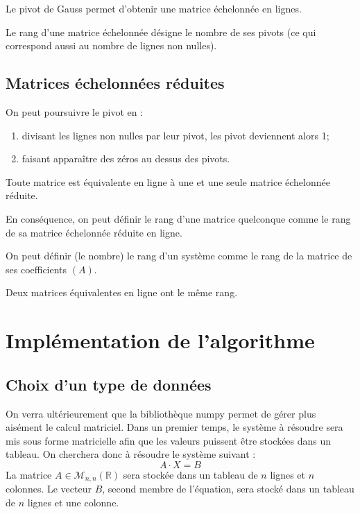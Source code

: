 \documentclass[10pt]{article}
\begin{document}
\begin{prop}
Le pivot de Gauss permet d'obtenir une matrice échelonnée en lignes. 
\end{prop}

\begin{defi}
Le rang d'une matrice échelonnée désigne le nombre de ses pivots (ce qui correspond aussi au nombre de lignes non nulles). 
\end{defi}

\subsection{Matrices échelonnées réduites}
On peut poursuivre le pivot en : 
\begin{enumerate}
\item divisant les lignes non nulles par leur pivot, les pivot deviennent alors 1;
\item faisant apparaître des zéros au dessus des pivots. 
\end{enumerate}

\begin{prop}
Toute matrice est équivalente en ligne à une et une seule matrice échelonnée réduite. 

En conséquence, on peut définir le rang d'une matrice quelconque comme le rang de sa matrice échelonnée réduite en ligne. 

On peut définir (le nombre) le rang d'un système comme le rang de la matrice de ses coefficients $(A)$. 
\end{prop}

\begin{rem}
Deux matrices équivalentes en ligne ont le même rang. 
\end{rem}

\section{Implémentation de l'algorithme}
\subsection{Choix d'un type de données}
On verra ultérieurement que la bibliothèque numpy permet de gérer plus aisément le calcul matriciel. Dans un premier temps, le système à résoudre sera mis sous forme matricielle afin que les valeurs puissent être stockées dans un tableau. 
On cherchera donc à résoudre le système suivant :
$$
A\cdot X = B
$$
La matrice $A\in\mathcal{M}_{n,n}(\mathbb{R})$ sera stockée dans un tableau de $n$ lignes et $n$ colonnes. Le vecteur $B$, second membre de l'équation, sera stocké dans un tableau de $n$ lignes et une colonne. 
\end{document}
